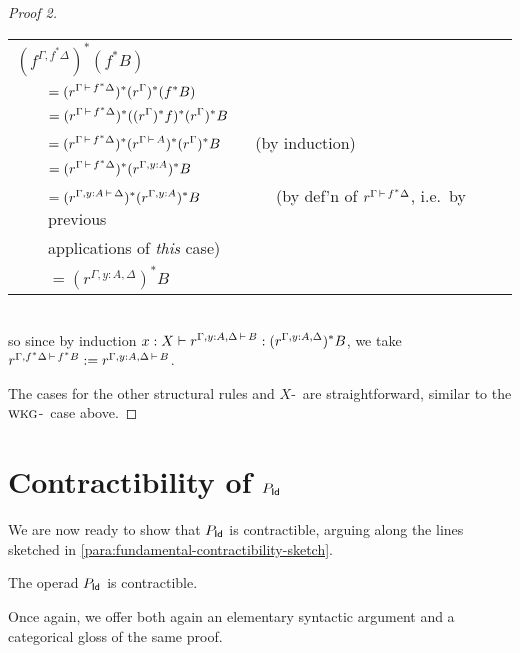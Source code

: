 \begin{proof}[Proof 2]
\noindent \begin{tabular}{ll}
\multicolumn{2}{l}{$\displaystyle (f^{\Gamma,f^*\Delta})^*(f^*B)$} \\
$\quad$ & $\displaystyle = (r^{\Gamma \,\vdash\, f^*\Delta})^*(r^\Gamma)^*(f^*B)$ \\
 & $\displaystyle = (r^{\Gamma \,\vdash\, f^*\Delta})^*((r^\Gamma)^*f)^*(r^\Gamma)^*B$ \\
 & $\displaystyle = (r^{\Gamma \,\vdash\, f^*\Delta})^*(r^{\Gamma \,\vdash\, A})^*(r^\Gamma)^*B \qquad$ \hfill (by induction) \\
 & $\displaystyle = (r^{\Gamma \,\vdash\, f^*\Delta})^*(r^{\Gamma,y:A})^*B$ \\
 & $\displaystyle = (r^{\Gamma,y:A \,\vdash\, \Delta})^*(r^{\Gamma,y:A})^*B \qquad \qquad \quad$ \hfill (by def'n of $r^{\Gamma \,\vdash\, f^*\Delta}$, i.e.\ by previous\\
 & \hfill applications of \emph{this} case)  \\
 & $\displaystyle = (r^{\Gamma,y:A,\Delta})^*B$ \\
\end{tabular}  \\
so since by induction $\displaystyle x:X \vdash r^{\Gamma,y:A,\Delta \,\vdash\, B}:(r^{\Gamma,y:A,\Delta})^*B$, we take $r^{\Gamma,f^*\Delta \,\vdash\, f^*B} := r^{\Gamma,y:A,\Delta \,\vdash\, B}$.

The cases for the other structural rules and $X$-\form\ are straightforward, similar to the $\textsc{wkg}$-\typerule\ case above. \doubleqed
\end{proof}






\section{Contractibility of \texorpdfstring{$P_{\mathsf{Id}}$}{P\_Id}}

We are now ready to show that $P_{\mathsf{Id}}$ is contractible, arguing along the lines sketched in \ref{para:fundamental-contractibility-sketch}.

\begin{theorem}\label{thm:p-is-contractible}The operad $P_{\mathsf{Id}}$ is contractible.
\end{theorem}

Once again, we offer both again an elementary syntactic argument and a categorical gloss of the same proof.

